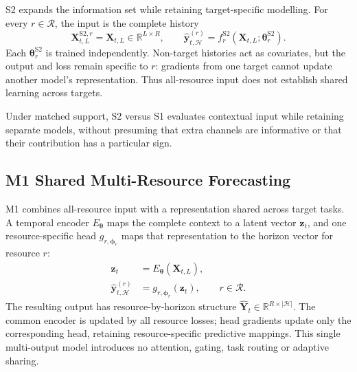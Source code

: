 \documentclass[a4paper,fleqn]{cas-dc}
\begin{document}
S2 expands the information set while retaining target-specific modelling. For
every $r\in\mathcal{R}$, the input is the complete history
\begin{equation}
  \mathbf{X}_{t,L}^{\mathrm{S2},r}=\mathbf{X}_{t,L}
  \in\mathbb{R}^{L\times R},
  \qquad
  \widehat{\mathbf{y}}_{t,\mathcal{H}}^{(r)}
  = f_r^{\mathrm{S2}}
    (\mathbf{X}_{t,L};\boldsymbol{\theta}_r^{\mathrm{S2}}).
  \label{eq:s2-forecast}
\end{equation}
Each $\boldsymbol{\theta}_r^{\mathrm{S2}}$ is trained independently.
Non-target histories act as covariates, but the output and loss remain
specific to $r$: gradients from one target cannot update another model's
representation. Thus all-resource input does not establish shared learning
across targets.

Under matched support, S2 versus S1 evaluates contextual input while retaining
separate models, without presuming that extra channels are informative or
that their contribution has a particular sign.

\subsection{M1 Shared Multi-Resource Forecasting}
\label{sec:m1}

M1 combines all-resource input with a representation shared across target
tasks. A temporal encoder $E_{\boldsymbol{\theta}}$ maps the complete context
to a latent vector $\mathbf{z}_t$, and one resource-specific head
$g_{r,\boldsymbol{\phi}_r}$ maps that representation to the horizon vector for
resource $r$:
\begin{equation}
  \begin{aligned}
    \mathbf{z}_t
      &= E_{\boldsymbol{\theta}}(\mathbf{X}_{t,L}), \\
    \widehat{\mathbf{y}}_{t,\mathcal{H}}^{(r)}
      &= g_{r,\boldsymbol{\phi}_r}(\mathbf{z}_t),
      && r\in\mathcal{R}.
  \end{aligned}
  \label{eq:m1-forecast}
\end{equation}
The resulting output has resource-by-horizon structure
$\widehat{\mathbf{Y}}_{t}\in\mathbb{R}^{R\times|\mathcal{H}|}$.
The common encoder is updated by all resource losses; head gradients update
only the corresponding head, retaining resource-specific predictive mappings.
This single multi-output model introduces no attention, gating, task routing
or adaptive sharing.
\end{document}
